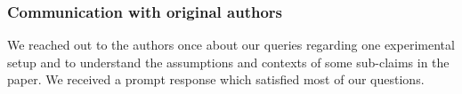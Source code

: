 
\subsubsection*{Communication with original authors}
We reached out to the authors once about our queries regarding one experimental setup and to understand the assumptions and contexts of some sub-claims in the paper. We received a prompt response which satisfied most of our questions. 
